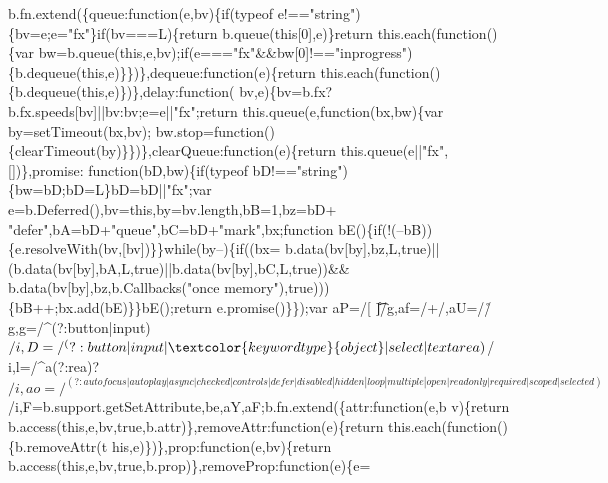 \begin{DoxyCode}
      b.fn.extend(\{queue:\textcolor{keyword}{function}(e,bv)\{\textcolor{keywordflow}{if}(typeof e!==\textcolor{stringliteral}{"string"})\{bv=e;e=\textcolor{stringliteral}{"fx"}\}\textcolor{keywordflow}{if}(bv===L)\{\textcolor{keywordflow}{return} 
      b.queue(\textcolor{keyword}{this}[0],e)\}\textcolor{keywordflow}{return} this.each(\textcolor{keyword}{function}()\{var bw=b.queue(\textcolor{keyword}{this},e,bv);\textcolor{keywordflow}{if}(e===\textcolor{stringliteral}{"fx"}&&bw[0]!==\textcolor{stringliteral}{"inprogress"})
      \{b.dequeue(\textcolor{keyword}{this},e)\}\})\},dequeue:\textcolor{keyword}{function}(e)\{\textcolor{keywordflow}{return} this.each(\textcolor{keyword}{function}()\{b.dequeue(\textcolor{keyword}{this},e)\})\},delay:\textcolor{keyword}{function}(
      bv,e)\{bv=b.fx?b.fx.speeds[bv]||bv:bv;e=e||\textcolor{stringliteral}{"fx"};\textcolor{keywordflow}{return} this.queue(e,\textcolor{keyword}{function}(bx,bw)\{var by=setTimeout(bx,bv);
      bw.stop=\textcolor{keyword}{function}()\{clearTimeout(by)\}\})\},clearQueue:\textcolor{keyword}{function}(e)\{\textcolor{keywordflow}{return} this.queue(e||\textcolor{stringliteral}{"fx"},[])\},promise:\textcolor{keyword}{
      function}(bD,bw)\{\textcolor{keywordflow}{if}(typeof bD!==\textcolor{stringliteral}{"string"})\{bw=bD;bD=L\}bD=bD||\textcolor{stringliteral}{"fx"};var e=b.Deferred(),bv=\textcolor{keyword}{this},by=bv.length,bB=1,bz=bD+\textcolor{stringliteral}{
      "defer"},bA=bD+\textcolor{stringliteral}{"queue"},bC=bD+\textcolor{stringliteral}{"mark"},bx;\textcolor{keyword}{function} bE()\{\textcolor{keywordflow}{if}(!(--bB))\{e.resolveWith(bv,[bv])\}\}\textcolor{keywordflow}{while}(by--)\{\textcolor{keywordflow}{if}((bx=
      b.data(bv[by],bz,L,\textcolor{keyword}{true})||(b.data(bv[by],bA,L,\textcolor{keyword}{true})||b.data(bv[by],bC,L,\textcolor{keyword}{true}))&&
      b.data(bv[by],bz,b.Callbacks(\textcolor{stringliteral}{"once memory"}),\textcolor{keyword}{true})))\{bB++;bx.add(bE)\}\}bE();\textcolor{keywordflow}{return} e.promise()\}\});var aP=/[
      \n\t\r]/g,af=/\s+/,aU=/\r/g,g=/^(?:button|input)$/i,D=/^(?:button|input|\textcolor{keywordtype}{object}|select|textarea)$/
      i,l=/^a(?:rea)?$/i,ao=/^(?:autofocus|autoplay|async|checked|controls|defer|disabled|hidden|loop|multiple|
      open|readonly|required|scoped|selected)$/i,F=b.support.getSetAttribute,be,aY,aF;b.fn.extend(\{attr:function(e,b
      v)\{return b.access(this,e,bv,true,b.attr)\},removeAttr:\textcolor{keyword}{function}(e)\{return this.each(function()\{b.removeAttr(t
      his,e)\})\},prop:\textcolor{keyword}{function}(e,bv)\{\textcolor{keywordflow}{return} b.access(\textcolor{keyword}{this},e,bv,\textcolor{keyword}{true},b.prop)\},removeProp:\textcolor{keyword}{function}(e)\{e=

\end{DoxyCode}
